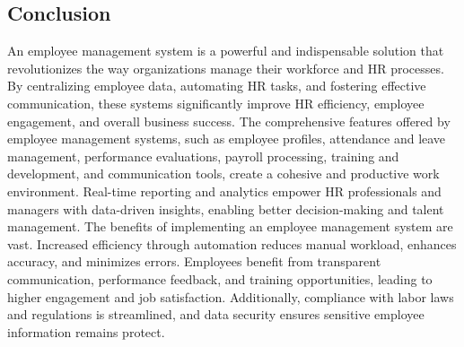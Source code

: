 \subsection{Conclusion}

An employee management system is a powerful and indispensable solution that
revolutionizes the way organizations manage their workforce and HR processes. By
centralizing employee data, automating HR tasks, and fostering effective communication,
these systems significantly improve HR efficiency, employee engagement, and overall
business success. The comprehensive features offered by employee management systems,
such as employee profiles, attendance and leave management, performance evaluations,
payroll processing, training and development, and communication tools, create a cohesive
and productive work environment. Real-time reporting and analytics empower HR
professionals and managers with data-driven insights, enabling better decision-making and
talent management. The benefits of implementing an employee management system are
vast. Increased efficiency through automation reduces manual workload, enhances accuracy,
and minimizes errors. Employees benefit from transparent communication, performance
feedback, and training opportunities, leading to higher engagement and job satisfaction.
Additionally, compliance with labor laws and regulations is streamlined, and data security
ensures sensitive employee information remains protect.